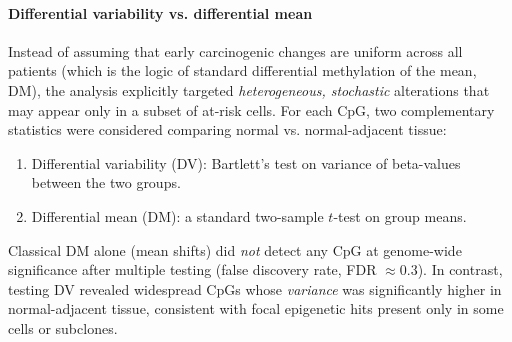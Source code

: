 \documentclass[10pt]{extarticle}
\begin{document}
\paragraph{Differential variability vs. differential mean}
Instead of assuming that early carcinogenic changes are uniform across all patients (which is the logic of standard differential methylation of the mean, DM), the analysis explicitly targeted \textit{heterogeneous, stochastic} alterations that may appear only in a subset of at-risk cells. For each CpG, two complementary statistics were considered comparing normal vs. normal-adjacent tissue: 
\begin{enumerate}
  \item Differential variability (DV): Bartlett’s test on variance of beta-values between the two groups.
  \item Differential mean (DM): a standard two-sample $t$-test on group means.
\end{enumerate}

Classical DM alone (mean shifts) did \textit{not} detect any CpG at genome-wide significance after multiple testing (false discovery rate, FDR $\approx 0.3$). In contrast, testing DV revealed widespread CpGs whose \textit{variance} was significantly higher in normal-adjacent tissue, consistent with focal epigenetic hits present only in some cells or subclones.
\end{document}
